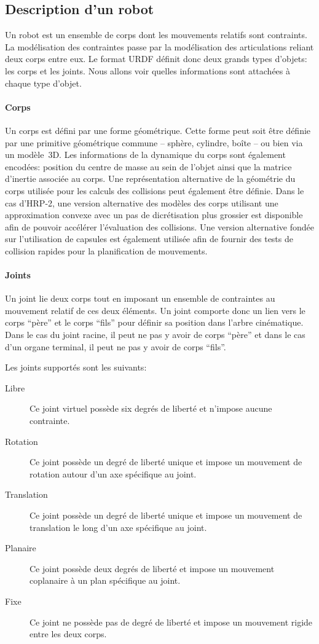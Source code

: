 \subsection{Description d'un robot}


Un robot est un ensemble de corps dont les mouvements relatifs sont
contraints. La modélisation des contraintes passe par la modélisation
des articulations reliant deux corps entre eux. Le format URDF définit
donc deux grands types d'objets: les corps et les joints. Nous allons
voir quelles informations sont attachées à chaque type d'objet.

\paragraph{Corps}

Un corps est défini par une forme géométrique. Cette forme peut soit
être définie par une primitive géométrique commune -- sphère,
cylindre, boîte -- ou bien via un modèle 3D. Les informations de la
dynamique du corps sont également encodées: position du centre de
masse au sein de l'objet ainsi que la matrice d'inertie associée au
corps. Une représentation alternative de la géométrie du corps
utilisée pour les calculs des collisions peut également être
définie. Dans le cas d'HRP-2, une version alternative des modèles des
corps utilisant une approximation convexe avec un pas de dicrétisation
plus grossier est disponible afin de pouvoir accélérer l'évaluation
des collisions. Une version alternative fondée sur l'utilisation de
capsules est également utilisée afin de fournir des tests de collision
rapides pour la planification de mouvements.


\paragraph{Joints}

Un joint lie deux corps tout en imposant un ensemble de contraintes au
mouvement relatif de ces deux éléments. Un joint comporte donc un lien
vers le corps ``père'' et le corps ``fils'' pour définir sa position
dans l'arbre cinématique. Dans le cas du joint racine, il peut ne pas
y avoir de corps ``père'' et dans le cas d'un organe terminal, il peut
ne pas y avoir de corps ``fils''.

Les joints supportés sont les suivants:
\begin{description}
\item[Libre] Ce joint virtuel possède six degrés de liberté et
  n'impose aucune contrainte.
\item[Rotation] Ce joint possède un degré de liberté unique et impose
  un mouvement de rotation autour d'un axe spécifique au joint.
\item[Translation] Ce joint possède un degré de liberté unique et
  impose un mouvement de translation le long d'un axe spécifique au
  joint.
\item[Planaire] Ce joint possède deux degrés de liberté et impose un
  mouvement coplanaire à un plan spécifique au joint.
\item[Fixe] Ce joint ne possède pas de degré de liberté et impose un
  mouvement rigide entre les deux corps.
\end{description}

